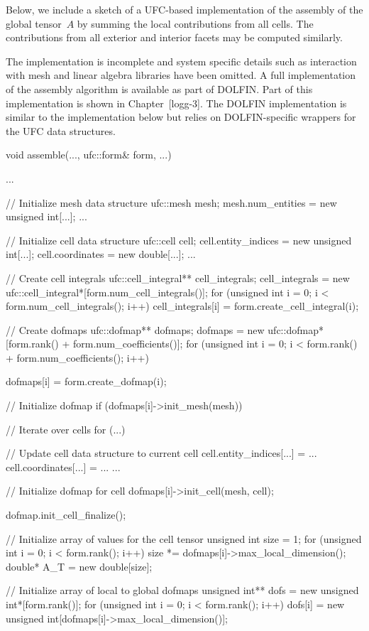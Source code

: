 Below, we include a sketch of a UFC-based implementation of the
assembly of the global tensor~$A$ by summing the local contributions
from all cells. The contributions from all exterior and interior
facets may be computed similarly.

The implementation is incomplete and system specific details such as
interaction with mesh and linear algebra libraries have been
omitted. A full implementation of the assembly algorithm is available
as part of DOLFIN. Part of this implementation is shown in
Chapter~[logg-3]. The DOLFIN implementation is similar to the
implementation below but relies on DOLFIN-specific wrappers for the
UFC data structures.

\begin{c++}
void assemble(..., ufc::form& form, ...)
{
  ...

  // Initialize mesh data structure
  ufc::mesh mesh;
  mesh.num_entities = new unsigned int[...];
  ...

  // Initialize cell data structure
  ufc::cell cell;
  cell.entity_indices = new unsigned int[...];
  cell.coordinates = new double[...];
  ...

  // Create cell integrals
  ufc::cell_integral** cell_integrals;
  cell_integrals = new ufc::cell_integral*[form.num_cell_integrals()];
  for (unsigned int i = 0; i < form.num_cell_integrals(); i++)
    cell_integrals[i] = form.create_cell_integral(i);

  // Create dofmaps
  ufc::dofmap** dofmaps;
  dofmaps = new ufc::dofmap*[form.rank() + form.num_coefficients()];
  for (unsigned int i = 0; i < form.rank() + form.num_coefficients(); i++)
  {
    dofmaps[i] = form.create_dofmap(i);

    // Initialize dofmap
    if (dofmaps[i]->init_mesh(mesh))
    {
      // Iterate over cells
      for (...)
      {
        // Update cell data structure to current cell
        cell.entity_indices[...] = ...
        cell.coordinates[...] = ...
        ...

        // Initialize dofmap for cell
        dofmaps[i]->init_cell(mesh, cell);
      }

      dofmap.init_cell_finalize();
    }
  }

  // Initialize array of values for the cell tensor
  unsigned int size = 1;
  for (unsigned int i = 0; i < form.rank(); i++)
    size *= dofmaps[i]->max_local_dimension();
  double* A_T = new double[size];

  // Initialize array of local to global dofmaps
  unsigned int** dofs = new unsigned int*[form.rank()];
  for (unsigned int i = 0; i < form.rank(); i++)
    dofs[i] = new unsigned int[dofmaps[i]->max_local_dimension()];

}
\end{c++}

